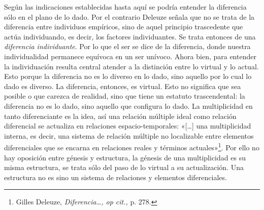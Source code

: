 Según las indicaciones establecidas hasta aquí se podría entender la diferencia sólo en el plano de lo dado. Por el contrario Deleuze señala que no se trata de la diferencia entre individuos empíricos, sino de aquel principio trascedente que actúa individuando, es decir, los factores individuantes. Se trata entonces de una \emph{diferencia individuante}. Por lo que el ser se dice de la diferencia, donde nuestra individualidad permanece equívoca en un ser unívoco. Ahora bien, para entender la individuación resulta central atender a la distinción entre lo virtual y lo actual. Esto porque la diferencia no es lo diverso en lo dado, sino aquello por lo cual lo dado es diverso. La diferencia, entonces, es virtual. Esto no significa que sea posible o que carezca de realidad, sino que tiene un estatuto trascendental: la diferencia no es lo dado, sino aquello que configura lo dado. La multiplicidad en tanto diferenciante es la idea, así una relación múltiple ideal como relación diferencial se actualiza en relaciones espacio-temporales: «{[}\ldots{]} una multiplicidad interna, es decir, una sistema de relación múltiple no localizable entre elementos diferenciales que se encarna en relaciones reales y términos actuales»\footnote{Gilles Deleuze, \emph{Diferencia\ldots, op cit.,} p. 278.}. Por ello no hay oposición entre génesis y estructura, la génesis de una multiplicidad es su misma estructura, se trata sólo del paso de lo virtual a su actualización. Una estructura no es sino un sistema de relaciones y elementos diferenciales.


